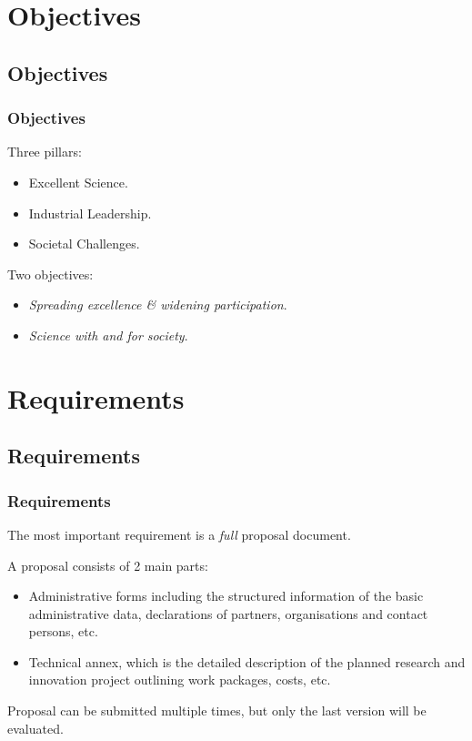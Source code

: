 \documentclass[compress,9pt,xcolor={dvipsnames,table}]{beamer}
\begin{document}
\section{Objectives}
\label{sec:objectives}
\subsection{Objectives}

\begin{frame}\frametitle{Objectives}
Three pillars:
\begin{itemize}
    \item Excellent Science.
    \item Industrial Leadership.
    \item Societal Challenges.
\end{itemize}
Two objectives:
\begin{itemize}
    \item \emph{Spreading excellence \& widening participation}.
    \item \emph{Science with and for society}.
\end{itemize}
\end{frame}

\section{Requirements}
\subsection{Requirements}

\begin{frame}\frametitle{Requirements}
The most important requirement is a \emph{full} proposal document.

A proposal consists of 2 main parts:
\begin{itemize}
  \item Administrative forms including the structured information of the basic administrative data, declarations of partners, organisations and contact persons, etc.
  \item Technical annex, which is the detailed description of the planned research and innovation project outlining work packages, costs, etc.
\end{itemize}

Proposal can be submitted multiple times, but only the last version will be evaluated.
\end{frame}
\end{document}
